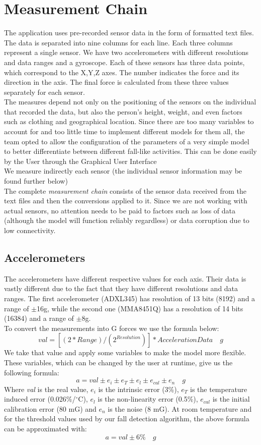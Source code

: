 \documentclass[hidelinks,conference,12pt]{IEEETran}
\begin{document}
\section{Measurement Chain}
The application uses pre-recorded sensor data in the form of formatted text files. The data is separated into nine columns for each line. Each three columns represent a single sensor. We have two accelerometers with different resolutions and data ranges and a gyroscope. Each of these sensors has three data points, which correspond to the X,Y,Z axes. The number indicates the force and its direction in the axis. The final force is calculated from these three values separately for each sensor.\\
The measures depend not only on the positioning of the sensors on the individual that recorded the data, but also the person's height, weight, and even factors such as clothing and geographical location. Since there are too many variables to account for and too little time to implement different models for them all, the team opted to allow the configuration of the parameters of a very simple model to better differentiate between different fall-like activities. This can be done easily by the User through the Graphical User Interface\\
We measure indirectly each sensor (the individual sensor information may be found further below)\\
The complete \textit{measurement chain} consists of the sensor data received from the text files and then the conversions applied to it. Since we are not working with actual sensors, no attention needs to be paid to factors such as loss of data (although the model will function reliably regardless) or data corruption due to low connectivity.

\subsection{Accelerometers}
The accelerometers have different respective values for each axis. Their data is vastly different due to the fact that they have different resolutions and data ranges. The first accelerometer (ADXL345) has resolution of 13 bits (8192) and a range of $\pm$16g, while the second one (MMA8451Q) has a resolution of 14 bits (16384) and a range of $\pm$8g. \\
To convert the measurements into G forces we use the formula below:
$$ val = [(2 * Range) / (2^{Resolution})] * AccelerationData \quad g $$
We take that value and apply some variables to make the model more flexible. These variables, which can be changed by the user at runtime, give us the following formula:
$$ a = val \pm e_i \pm e_T \pm e_l \pm e_{cal} \pm e_n \quad g $$
Where \textit{val} is the real value, $e_i$ is the intrinsic error (3\%), $e_T$ is the temperature induced error (0.026\%/$^{\circ}$C), $e_l$ is the non-linearity error (0.5\%), $e_{cal}$ is the initial calibration error (80 mG) and $e_n$ is the noise (8 mG). At room temperature and for the threshold values used by our fall detection algorithm, the above formula can be approximated with:
$$ a = val \pm 6\%  \quad g $$
\end{document}
